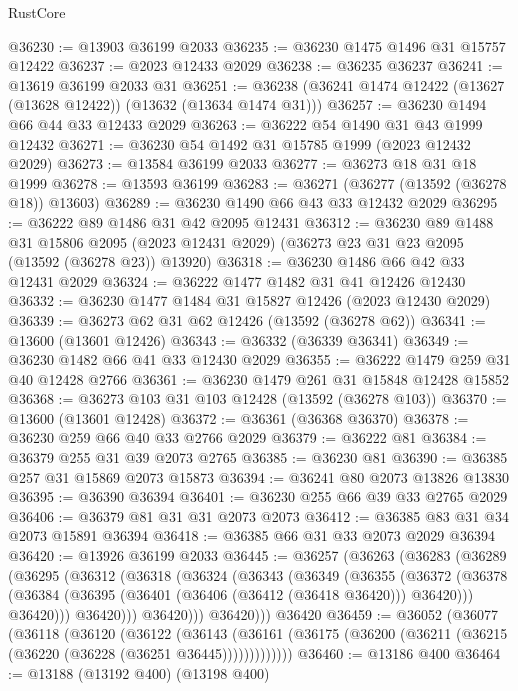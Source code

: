 \begin{lexlean}{RustCore}
\begin{coremodule}
@36230 := @13903 @36199 @2033
@36235 := @36230 @1475 @1496 @31 @15757 @12422
@36237 := @2023 @12433 @2029
@36238 := @36235 @36237
@36241 := @13619 @36199 @2033 @31
@36251 := @36238 (@36241 @1474 @12422 (@13627 (@13628 @12422)) (@13632 (@13634 @1474 @31)))
@36257 := @36230 @1494 @66 @44 @33 @12433 @2029
@36263 := @36222 @54 @1490 @31 @43 @1999 @12432
@36271 := @36230 @54 @1492 @31 @15785 @1999 (@2023 @12432 @2029)
@36273 := @13584 @36199 @2033
@36277 := @36273 @18 @31 @18 @1999
@36278 := @13593 @36199
@36283 := @36271 (@36277 (@13592 (@36278 @18)) @13603)
@36289 := @36230 @1490 @66 @43 @33 @12432 @2029
@36295 := @36222 @89 @1486 @31 @42 @2095 @12431
@36312 := @36230
    @89
    @1488
    @31
    @15806
    @2095
    (@2023 @12431 @2029)
    (@36273 @23 @31 @23 @2095 (@13592 (@36278 @23)) @13920)
@36318 := @36230 @1486 @66 @42 @33 @12431 @2029
@36324 := @36222 @1477 @1482 @31 @41 @12426 @12430
@36332 := @36230 @1477 @1484 @31 @15827 @12426 (@2023 @12430 @2029)
@36339 := @36273 @62 @31 @62 @12426 (@13592 (@36278 @62))
@36341 := @13600 (@13601 @12426)
@36343 := @36332 (@36339 @36341)
@36349 := @36230 @1482 @66 @41 @33 @12430 @2029
@36355 := @36222 @1479 @259 @31 @40 @12428 @2766
@36361 := @36230 @1479 @261 @31 @15848 @12428 @15852
@36368 := @36273 @103 @31 @103 @12428 (@13592 (@36278 @103))
@36370 := @13600 (@13601 @12428)
@36372 := @36361 (@36368 @36370)
@36378 := @36230 @259 @66 @40 @33 @2766 @2029
@36379 := @36222 @81
@36384 := @36379 @255 @31 @39 @2073 @2765
@36385 := @36230 @81
@36390 := @36385 @257 @31 @15869 @2073 @15873
@36394 := @36241 @80 @2073 @13826 @13830
@36395 := @36390 @36394
@36401 := @36230 @255 @66 @39 @33 @2765 @2029
@36406 := @36379 @81 @31 @31 @2073 @2073
@36412 := @36385 @83 @31 @34 @2073 @15891 @36394
@36418 := @36385 @66 @31 @33 @2073 @2029 @36394
@36420 := @13926 @36199 @2033
@36445 := @36257
    (@36263
      (@36283
        (@36289
          (@36295
            (@36312
              (@36318
                (@36324
                  (@36343
                    (@36349
                      (@36355
                        (@36372
                          (@36378
                            (@36384 (@36395 (@36401 (@36406 (@36412 (@36418 @36420))) @36420)))
                            @36420)))
                      @36420)))
                @36420)))
          @36420)))
    @36420
@36459 := @36052
    (@36077
      (@36118
        (@36120
          (@36122
            (@36143
              (@36161 (@36175 (@36200 (@36211 (@36215 (@36220 (@36228 (@36251 @36445)))))))))))))
@36460 := @13186 @400
@36464 := @13188 (@13192 @400) (@13198 @400)

\end{coremodule}
\end{lexlean}

